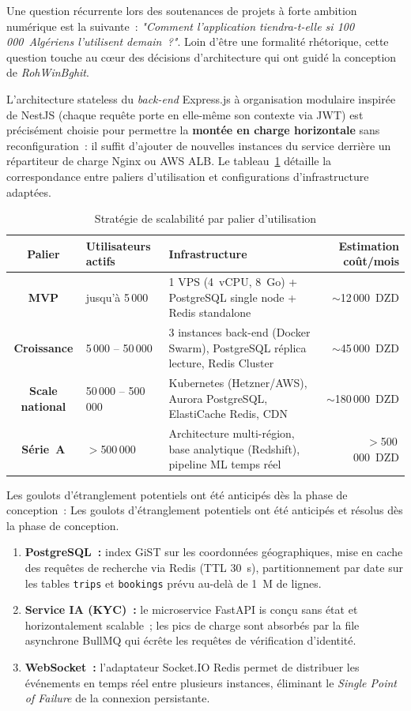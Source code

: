 Une question récurrente lors des soutenances de projets à forte ambition numérique est la suivante~: \textit{"Comment l'application tiendra-t-elle si 100\,000~Algériens l'utilisent demain~?"}. Loin d'être une formalité rhétorique, cette question touche au cœur des décisions d'architecture qui ont guidé la conception de \textit{RohWinBghit}.

L'architecture stateless du \textit{back-end} Express.js à organisation modulaire inspirée de NestJS (chaque requête porte en elle-même son contexte via JWT) est précisément choisie pour permettre la \textbf{montée en charge horizontale} sans reconfiguration~: il suffit d'ajouter de nouvelles instances du service derrière un répartiteur de charge Nginx ou AWS ALB. Le tableau~\ref{tab:scalabilite} détaille la correspondance entre paliers d'utilisation et configurations d'infrastructure adaptées.

\begin{table}[H]
\centering
\footnotesize
\begin{tabularx}{\textwidth}{|c|l|X|r|}
\hline
\rowcolor{rohlight}
\textbf{Palier} & \textbf{Utilisateurs actifs} & \textbf{Infrastructure} & \textbf{Estimation coût/mois} \\
\hline
\textbf{MVP} & jusqu'à 5\,000 & 1 VPS (4~vCPU, 8~Go) + PostgreSQL single node + Redis standalone & $\sim$12\,000~DZD \\
\hline
\textbf{Croissance} & 5\,000 -- 50\,000 & 3 instances back-end (Docker Swarm), PostgreSQL réplica lecture, Redis Cluster & $\sim$45\,000~DZD \\
\hline
\textbf{Scale national} & 50\,000 -- 500\,000 & Kubernetes (Hetzner/AWS), Aurora PostgreSQL, ElastiCache Redis, CDN & $\sim$180\,000~DZD \\
\hline
\textbf{Série~A} & $>$500\,000 & Architecture multi-région, base analytique (Redshift), pipeline ML temps réel & $>$500\,000~DZD \\
\hline
\end{tabularx}
  \caption{Stratégie de scalabilité par palier d'utilisation}
  \label{tab:scalabilite}
\end{table}

Les goulots d'étranglement potentiels ont été anticipés dès la phase de conception~:
Les goulots d'étranglement potentiels ont été anticipés et résolus dès la phase de conception.
\begin{enumerate}
  \item \textbf{PostgreSQL~:} index GiST sur les coordonnées géographiques, mise en cache des requêtes de recherche via Redis (TTL 30~s), partitionnement par date sur les tables \texttt{trips} et \texttt{bookings} prévu au-delà de 1~M de lignes.
  \item \textbf{Service IA (KYC)~:} le microservice FastAPI is conçu sans état et horizontalement scalable~; les pics de charge sont absorbés par la file asynchrone BullMQ qui écrête les requêtes de vérification d'identité.
  \item \textbf{WebSocket~:} l'adaptateur Socket.IO Redis permet de distribuer les événements en temps réel entre plusieurs instances, éliminant le \textit{Single Point of Failure} de la connexion persistante.
\end{enumerate}

